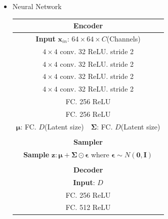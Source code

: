        \begin{itemize}
            \item Neural Network
            \begin{center}
                \begin{tabular}{| c | c |}
                    \multicolumn{2}{c}{\textbf{Encoder}}\\
                    \hline
                    \multicolumn{2}{|c|}{\textbf{Input} $\bm{x}_{in}$: $64 \times 64 \times C$(Channels)}\\
                    \hline
                    \multicolumn{2}{|c|}{$4 \times 4$ conv. 32 ReLU. stride 2}\\
                    \hline
                    \multicolumn{2}{|c|}{$4 \times 4$ conv. 32 ReLU. stride 2}\\
                    \hline
                    \multicolumn{2}{|c|}{$4 \times 4$ conv. 32 ReLU. stride 2}\\
                    \hline
                    \multicolumn{2}{|c|}{$4 \times 4$ conv. 32 ReLU. stride 2}\\
                    \hline
                    \multicolumn{2}{|c|}{FC. 256 ReLU}\\
                    \hline
                    \multicolumn{2}{|c|}{FC. 256 ReLU}\\
                    \hline
                    $\bm{\mu}$: FC. $D$(Latent size) & $\bm{\Sigma}$: FC. $D$(Latent size) \\
                    \hline
                    \multicolumn{2}{c}{}\\
                    \multicolumn{2}{c}{\textbf{Sampler}}\\
                    \hline
                    \multicolumn{2}{|c|}{\textbf{Sample} $\bm{z}: \bm{\mu} + \bm{\Sigma} \odot \bm{\epsilon}$ where $\bm{\epsilon} \sim N(\bm{0},\bm{I})$}\\
                    \hline
                    \multicolumn{2}{c}{}\\
                    \multicolumn{2}{c}{\textbf{Decoder}}\\
                    \hline
                    \multicolumn{2}{|c|}{\textbf{Input}: $D$}\\
                    \hline
                    \multicolumn{2}{|c|}{FC. 256 ReLU}\\
                    \hline
                    \multicolumn{2}{|c|}{FC. 512 ReLU}\\
                    \hline

\end{tabular}
\end{center}
\end{itemize}
